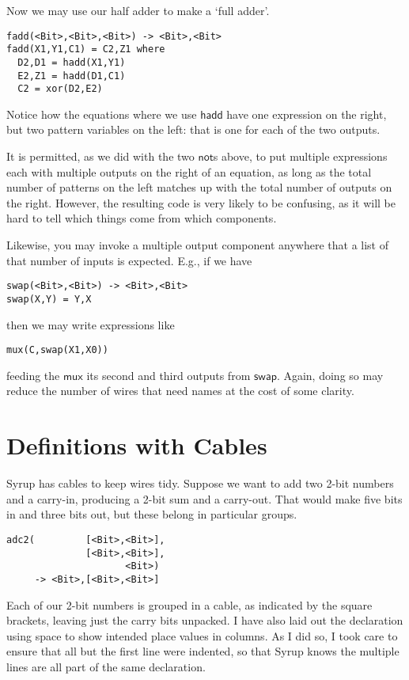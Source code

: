 \documentclass{article}
\newcommand{\C}{\mathsf}
\begin{document}
Now we may use our half adder to make a `full adder'.
\begin{verbatim}
fadd(<Bit>,<Bit>,<Bit>) -> <Bit>,<Bit>
fadd(X1,Y1,C1) = C2,Z1 where
  D2,D1 = hadd(X1,Y1)
  E2,Z1 = hadd(D1,C1)
  C2 = xor(D2,E2)
\end{verbatim}
Notice how the equations where we use $\C{hadd}$ have one expression
on the right, but two pattern variables on the left: that is one for
each of the two outputs.

It is permitted, as we did with the two $\C{not}$s above, to put
multiple expressions each with multiple outputs on the right of
an equation, as long as the total number of patterns on the left
matches up with the total number of outputs on the right. However,
the resulting code is very likely to be confusing, as it will be
hard to tell which things come from which components.

Likewise, you may invoke a multiple output component anywhere that
a list of that number of inputs is expected. E.g., if we have
\begin{verbatim}
swap(<Bit>,<Bit>) -> <Bit>,<Bit>
swap(X,Y) = Y,X
\end{verbatim}
then we may write expressions like
\begin{verbatim}
mux(C,swap(X1,X0))
\end{verbatim}
feeding the $\C{mux}$ its second and third outputs from $\C{swap}$.
Again, doing so may reduce the number of wires that need names at the
cost of some clarity.


\section{Definitions with Cables}

Syrup has cables to keep wires tidy. Suppose we want to add two 2-bit
numbers and a carry-in, producing a 2-bit sum and a carry-out. That
would make five bits in and three bits out, but these belong in
particular groups.
\begin{verbatim}
adc2(         [<Bit>,<Bit>],
              [<Bit>,<Bit>],
                     <Bit>)
     -> <Bit>,[<Bit>,<Bit>]
\end{verbatim}
Each of our 2-bit numbers is grouped in a cable, as indicated by the
square brackets, leaving just the
carry bits unpacked. I have also laid out the declaration using
space to show intended place values in columns. As I did so, I took care to ensure
that all but the first line were indented, so that Syrup knows the
multiple lines are all part of the same declaration.
\end{document}
